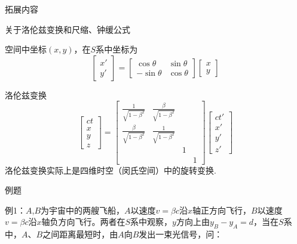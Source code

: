 \documentclass[a4paper,titlepage,onecolmn]{ctexart}
\begin{document}
\begin{section}{拓展内容}
\begin{subsection}{关于洛伦兹变换和尺缩、钟缓公式}
\begin{multicols}{2}
空间中坐标$(x,y)$，在$S$系中坐标为
\begin{equation*}
\begin{bmatrix}
x'\\y'
\end{bmatrix}
=
\begin{bmatrix}
\cos{\theta} & \sin{\theta}\\-\sin{\theta} & \cos{\theta}
\end{bmatrix}
\begin{bmatrix}
x\\y
\end{bmatrix}
\end{equation*}

\end{multicols}
洛伦兹变换
\begin{equation*}
\begin{bmatrix}
ct\\x\\y\\z
\end{bmatrix}
=
\begin{bmatrix}
\frac{1}{\sqrt{1-\beta^2}}&\frac{\beta}{\sqrt{1-\beta^2}}\\
\frac{\beta}{\sqrt{1-\beta^2}}&\frac{1}{\sqrt{1-\beta^2}}\\
&&1\\
&&&1
\end{bmatrix}
\begin{bmatrix}
ct'\\x'\\y'\\z'
\end{bmatrix}
\end{equation*}
洛伦兹变换实际上是四维时空（闵氏空间）中的旋转变换.
\end{subsection}

\begin{subsection}{例题}
\begin{multicols}{2}
例1：$A$,$B$为宇宙中的两艘飞船，$A$以速度$v=\beta c$沿$x$轴正方向飞行，$B$以速度$v=\beta c$沿$x$轴负方向飞行。两者在$S$系中观察，$y$方向上由$y_B-y_A=d$，当在$S$系中，$A、B$之间距离最短时，由$A$向$B$发出一束光信号，问：


\end{multicols}
\end{subsection}
\end{section}
\end{document}

